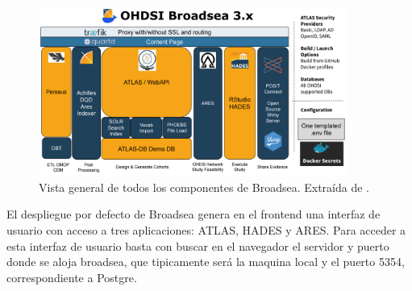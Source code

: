 \begin{figure}[H]
    \centering
    \includegraphics[width=0.90\textwidth]{figures/OHDSIBroadsea3.0.png}
    \caption{Vista general de todos los componentes de Broadsea. Extraída de \cite{Broadsea3PPTX}.}
    \label{fig:OHDSIBroadsea3.0}
\end{figure}

El despliegue por defecto de Broadsea genera en el frontend una interfaz de usuario con acceso a tres aplicaciones: ATLAS, HADES y ARES. Para acceder a esta interfaz de usuario basta con buscar en el navegador el servidor y puerto donde se aloja broadsea, que tipicamente será la maquina local y el puerto 5354, correspondiente a Postgre.

